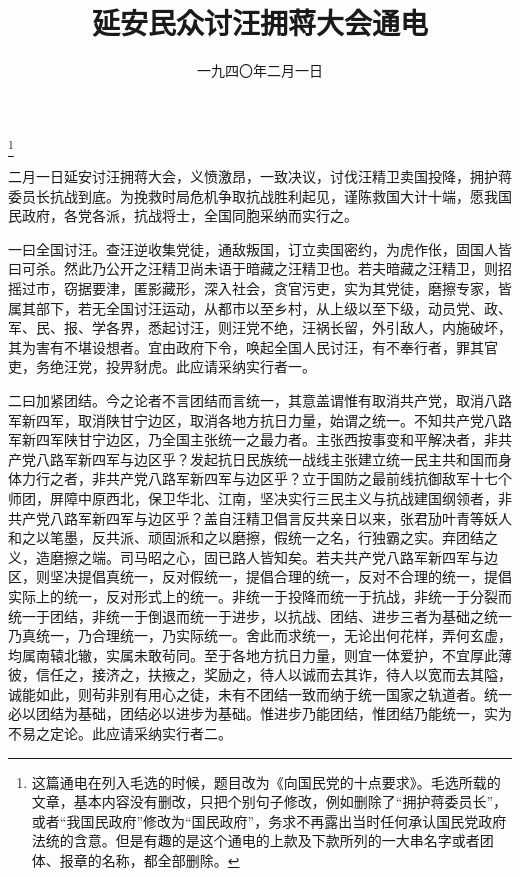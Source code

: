 
\title{延安民众讨汪拥蒋大会通电}
\date{一九四〇年二月一日}
\thanks{这篇通电在列入毛选的时候，题目改为《向国民党的十点要求》。毛选所载的文章，基本内容没有删改，只把个别句子修改，例如删除了“拥护蒋委员长”，或者“我国民政府”修改为“国民政府”，务求不再露出当时任何承认国民党政府法统的含意。但是有趣的是这个通电的上款及下款所列的一大串名字或者团体、报章的名称，都全部删除。}
\maketitle




二月一日延安讨汪拥蒋大会，义愤激昂，一致决议，讨伐汪精卫卖国投降，拥护蒋委员长抗战到底。为挽救时局危机争取抗战胜利起见，谨陈救国大计十端，愿我国民政府，各党各派，抗战将士，全国同胞采纳而实行之。

一曰全国讨汪。查汪逆收集党徒，通敌叛国，订立卖国密约，为虎作伥，固国人皆曰可杀。然此乃公开之汪精卫尚未语于暗藏之汪精卫也。若夫暗藏之汪精卫，则招摇过市，窃据要津，匿影藏形，深入社会，贪官污吏，实为其党徒，磨擦专家，皆属其部下，若无全国讨汪运动，从都市以至乡村，从上级以至下级，动员党、政、军、民、报、学各界，悉起讨汪，则汪党不绝，汪祸长留，外引敌人，内施破坏，其为害有不堪设想者。宜由政府下令，唤起全国人民讨汪，有不奉行者，罪其官吏，务绝汪党，投畀豺虎。此应请采纳实行者一。

二曰加紧团结。今之论者不言团结而言统一，其意盖谓惟有取消共产党，取消八路军新四军，取消陕甘宁边区，取消各地方抗日力量，始谓之统一。不知共产党八路军新四军陕甘宁边区，乃全国主张统一之最力者。主张西按事变和平解决者，非共产党八路军新四军与边区乎？发起抗日民族统一战线主张建立统一民主共和国而身体力行之者，非共产党八路军新四军与边区乎？立于国防之最前线抗御敌军十七个师团，屏障中原西北，保卫华北、江南，坚决实行三民主义与抗战建国纲领者，非共产党八路军新四军与边区乎？盖自汪精卫倡言反共亲日以来，张君劢叶青等妖人和之以笔墨，反共派、顽固派和之以磨擦，假统一之名，行独霸之实。弃团结之义，造磨擦之端。司马昭之心，固已路人皆知矣。若夫共产党八路军新四军与边区，则坚决提倡真统一，反对假统一，提倡合理的统一，反对不合理的统一，提倡实际上的统一，反对形式上的统一。非统一于投降而统一于抗战，非统一于分裂而统一于团结，非统一于倒退而统一于进步，以抗战、团结、进步三者为基础之统一乃真统一，乃合理统一，乃实际统一。舍此而求统一，无论出何花样，弄何玄虚，均属南辕北辙，实属未敢茍同。至于各地方抗日力量，则宜一体爱护，不宜厚此薄彼，信任之，接济之，扶掖之，奖励之，待人以诚而去其诈，待人以宽而去其隘，诚能如此，则茍非别有用心之徒，未有不团结一致而纳于统一国家之轨道者。统一必以团结为基础，团结必以进步为基础。惟进步乃能团结，惟团结乃能统一，实为不易之定论。此应请采纳实行者二。

